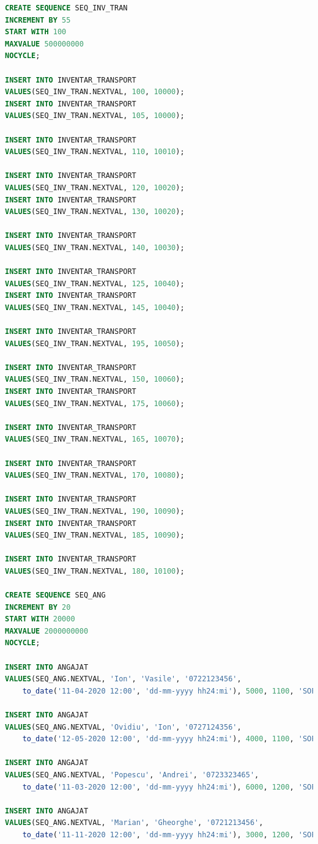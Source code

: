 \documentclass[12pt, a4paper]{article}
\begin{document}
\begin{lstlisting}[language=SQL]
CREATE SEQUENCE SEQ_INV_TRAN
INCREMENT BY 55
START WITH 100
MAXVALUE 500000000
NOCYCLE;

INSERT INTO INVENTAR_TRANSPORT
VALUES(SEQ_INV_TRAN.NEXTVAL, 100, 10000);
INSERT INTO INVENTAR_TRANSPORT
VALUES(SEQ_INV_TRAN.NEXTVAL, 105, 10000);

INSERT INTO INVENTAR_TRANSPORT
VALUES(SEQ_INV_TRAN.NEXTVAL, 110, 10010);

INSERT INTO INVENTAR_TRANSPORT
VALUES(SEQ_INV_TRAN.NEXTVAL, 120, 10020);
INSERT INTO INVENTAR_TRANSPORT
VALUES(SEQ_INV_TRAN.NEXTVAL, 130, 10020);

INSERT INTO INVENTAR_TRANSPORT
VALUES(SEQ_INV_TRAN.NEXTVAL, 140, 10030);

INSERT INTO INVENTAR_TRANSPORT
VALUES(SEQ_INV_TRAN.NEXTVAL, 125, 10040);
INSERT INTO INVENTAR_TRANSPORT
VALUES(SEQ_INV_TRAN.NEXTVAL, 145, 10040);

INSERT INTO INVENTAR_TRANSPORT
VALUES(SEQ_INV_TRAN.NEXTVAL, 195, 10050);

INSERT INTO INVENTAR_TRANSPORT
VALUES(SEQ_INV_TRAN.NEXTVAL, 150, 10060);
INSERT INTO INVENTAR_TRANSPORT
VALUES(SEQ_INV_TRAN.NEXTVAL, 175, 10060);

INSERT INTO INVENTAR_TRANSPORT
VALUES(SEQ_INV_TRAN.NEXTVAL, 165, 10070);

INSERT INTO INVENTAR_TRANSPORT
VALUES(SEQ_INV_TRAN.NEXTVAL, 170, 10080);

INSERT INTO INVENTAR_TRANSPORT
VALUES(SEQ_INV_TRAN.NEXTVAL, 190, 10090);
INSERT INTO INVENTAR_TRANSPORT
VALUES(SEQ_INV_TRAN.NEXTVAL, 185, 10090);

INSERT INTO INVENTAR_TRANSPORT
VALUES(SEQ_INV_TRAN.NEXTVAL, 180, 10100);

CREATE SEQUENCE SEQ_ANG
INCREMENT BY 20
START WITH 20000
MAXVALUE 2000000000
NOCYCLE;

INSERT INTO ANGAJAT
VALUES(SEQ_ANG.NEXTVAL, 'Ion', 'Vasile', '0722123456', 
    to_date('11-04-2020 12:00', 'dd-mm-yyyy hh24:mi'), 5000, 1100, 'SOFER', null);

INSERT INTO ANGAJAT
VALUES(SEQ_ANG.NEXTVAL, 'Ovidiu', 'Ion', '0727124356', 
    to_date('12-05-2020 12:00', 'dd-mm-yyyy hh24:mi'), 4000, 1100, 'SOFER', null);
    
INSERT INTO ANGAJAT
VALUES(SEQ_ANG.NEXTVAL, 'Popescu', 'Andrei', '0723323465', 
    to_date('11-03-2020 12:00', 'dd-mm-yyyy hh24:mi'), 6000, 1200, 'SOFER', null);
    
INSERT INTO ANGAJAT
VALUES(SEQ_ANG.NEXTVAL, 'Marian', 'Gheorghe', '0721213456', 
    to_date('11-11-2020 12:00', 'dd-mm-yyyy hh24:mi'), 3000, 1200, 'SOFER', null);
    

\end{lstlisting}
\end{document}
